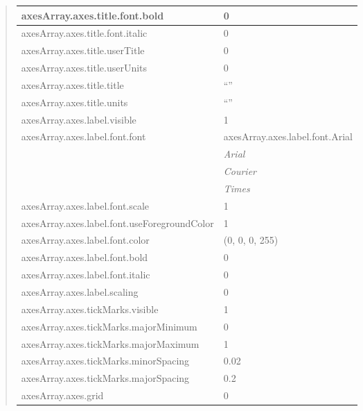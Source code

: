 \documentclass[letterpaper,10pt,english]{sphinxmanual}
\begin{document}
\begin{quote}
\begin{longtable}{|l|l|}
\hline
axesArray.axes.title.font.bold
 & 
0
\\
\hline
axesArray.axes.title.font.italic
 & 
0
\\
\hline
axesArray.axes.title.userTitle
 & 
0
\\
\hline
axesArray.axes.title.userUnits
 & 
0
\\
\hline
axesArray.axes.title.title
 & 
``''
\\
\hline
axesArray.axes.title.units
 & 
``''
\\
\hline
axesArray.axes.label.visible
 & 
1
\\
\hline
axesArray.axes.label.font.font
 & 
axesArray.axes.label.font.Arial
\\
\hline & 
\emph{Arial}
\\
\hline & 
\emph{Courier}
\\
\hline & 
\emph{Times}
\\
\hline
axesArray.axes.label.font.scale
 & 
1
\\
\hline
axesArray.axes.label.font.useForegroundColor
 & 
1
\\
\hline
axesArray.axes.label.font.color
 & 
(0, 0, 0, 255)
\\
\hline
axesArray.axes.label.font.bold
 & 
0
\\
\hline
axesArray.axes.label.font.italic
 & 
0
\\
\hline
axesArray.axes.label.scaling
 & 
0
\\
\hline
axesArray.axes.tickMarks.visible
 & 
1
\\
\hline
axesArray.axes.tickMarks.majorMinimum
 & 
0
\\
\hline
axesArray.axes.tickMarks.majorMaximum
 & 
1
\\
\hline
axesArray.axes.tickMarks.minorSpacing
 & 
0.02
\\
\hline
axesArray.axes.tickMarks.majorSpacing
 & 
0.2
\\
\hline
axesArray.axes.grid
 & 
0
\\
\hline\end{longtable}

\end{quote}

\begin{DUlineblock}{0em}
\item[] 
\end{DUlineblock}

\begin{DUlineblock}{0em}
\item[] 
\end{DUlineblock}
\end{document}
